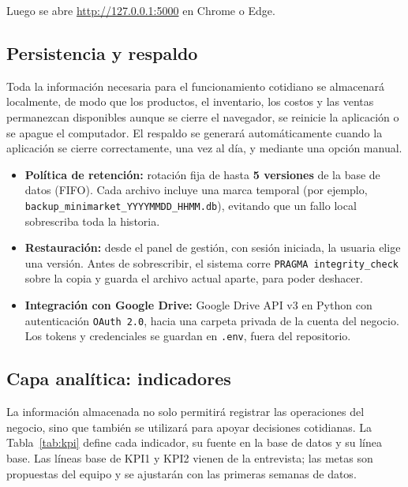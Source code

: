 \documentclass[10pt,a4paper]{article}
\begin{document}
Luego se abre \url{http://127.0.0.1:5000} en Chrome o Edge.

\subsection{Persistencia y respaldo}

Toda la información necesaria para el funcionamiento cotidiano se almacenará localmente, de modo que los productos, el inventario, los costos y las ventas permanezcan disponibles aunque se cierre el navegador, se reinicie la aplicación o se apague el computador. El respaldo se generará automáticamente cuando la aplicación se cierre correctamente, una vez al día, y mediante una opción manual.

\begin{itemize}
    \item \textbf{Política de retención:} rotación fija de hasta \textbf{5 versiones} de la base de datos (FIFO). Cada archivo incluye una marca temporal (por ejemplo, \texttt{backup\_minimarket\_YYYYMMDD\_HHMM.db}), evitando que un fallo local sobrescriba toda la historia.
    \item \textbf{Restauración:} desde el panel de gestión, con sesión iniciada, la usuaria elige una versión. Antes de sobrescribir, el sistema corre \texttt{PRAGMA integrity\_check} sobre la copia y guarda el archivo actual aparte, para poder deshacer.
    \item \textbf{Integración con Google Drive:} Google Drive API v3 en Python con autenticación \texttt{OAuth 2.0}, hacia una carpeta privada de la cuenta del negocio. Los tokens y credenciales se guardan en \texttt{.env}, fuera del repositorio.
\end{itemize}

\subsection{Capa analítica: indicadores}
\label{sec:kpi}

La información almacenada no solo permitirá registrar las operaciones del negocio, sino que también se utilizará para apoyar decisiones cotidianas. La Tabla~\ref{tab:kpi} define cada indicador, su fuente en la base de datos y su línea base. Las líneas base de KPI1 y KPI2 vienen de la entrevista; las metas son propuestas del equipo y se ajustarán con las primeras semanas de datos.
\end{document}
